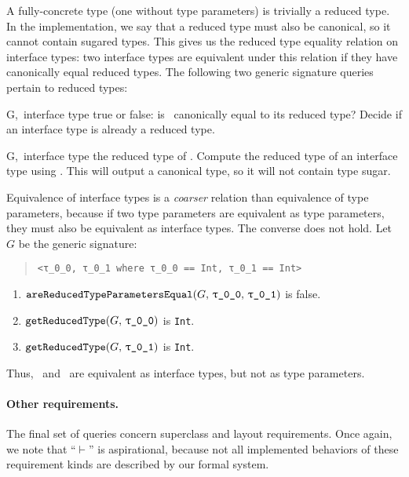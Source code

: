 \documentclass[../generics]{subfiles}
\begin{document}
A fully-concrete type (one without type parameters) is trivially a reduced type. In the implementation, we say that a reduced type must also be canonical, so it cannot contain sugared types. This gives us the reduced type equality relation on interface types: two interface types are equivalent under this relation if they have canonically equal reduced types. The following two generic signature queries pertain to reduced types:

\begin{itemize}
{G,\,\tT}
{interface type \tT}
{true or false: is \tT\ canonically equal to its reduced type?}
{Decide if an interface type is already a reduced type.}

{G,\,\tT}
{interface type \tT}
{the reduced type of \tT.}
{Compute the reduced type of an interface type using . This will output a canonical type, so it will not contain type sugar.}
\end{itemize}

\begin{example}
Equivalence of interface types is a \emph{coarser} relation than equivalence of type parameters, because if two type parameters are equivalent as type parameters, they must also be equivalent as interface types. The converse does not hold. Let~$G$ be the generic signature:
\begin{quote}
\begin{verbatim}
<τ_0_0, τ_0_1 where τ_0_0 == Int, τ_0_1 == Int>
\end{verbatim}
\end{quote}
\begin{enumerate}
\item $\Query{areReducedTypeParametersEqual}{G,\,\rT,\,\rU}$ is false.
\item $\Query{getReducedType}{G,\,\rT}$ is \texttt{Int}.
\item $\Query{getReducedType}{G,\,\rU}$ is \texttt{Int}.
\end{enumerate}
Thus, \rT\ and \rU\ are equivalent as interface types, but not as type parameters.
\end{example}

\paragraph{Other requirements.} The final set of queries concern superclass and layout requirements. Once again, we note that ``$\vdash$'' is aspirational, because not all implemented behaviors of these requirement kinds are described by our formal system.
\end{document}
